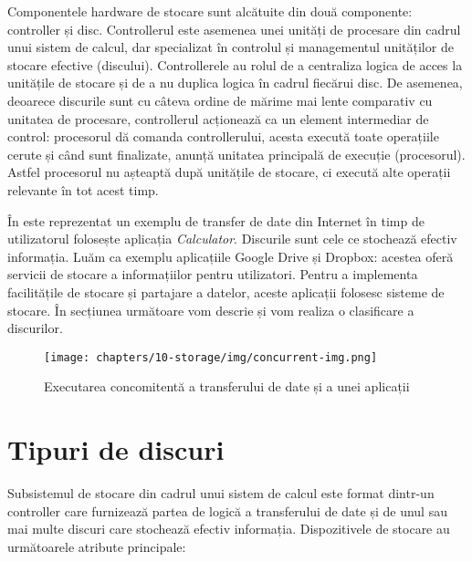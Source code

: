 Componentele hardware de stocare sunt alcătuite
din două componente: controller și disc. Controllerul este asemenea unei
unități de procesare din cadrul unui sistem de calcul, dar specializat în
controlul și managementul unităților de stocare efective (discului). Controllerele au
rolul de a centraliza logica de acces la unitățile de stocare și de a nu duplica
logica în cadrul fiecărui disc. De asemenea, deoarece discurile sunt cu câteva
ordine de mărime mai lente comparativ cu unitatea de procesare, controllerul
acționează ca un element intermediar de control: procesorul dă comanda
controllerului, acesta execută toate operațiile cerute și când sunt finalizate,
anunță unitatea principală de execuție (procesorul). Astfel procesorul nu
așteaptă după unitățile de stocare, ci execută alte operații relevante în tot
acest timp.

În  este reprezentat un
exemplu de transfer de date din Internet în timp de
utilizatorul folosește aplicația \textit{Calculator}. Discurile sunt cele ce
stochează efectiv informația. Luăm ca exemplu aplicațiile Google Drive și
Dropbox: acestea oferă servicii de stocare a informațiilor pentru utilizatori.
Pentru a implementa facilitățile de stocare și partajare a datelor, aceste
aplicații folosesc sisteme de stocare. În secțiunea următoare vom descrie și vom
realiza o clasificare a discurilor.

\begin{figure}[!htbp]
	\centering
	\texttt{[image: chapters/10-storage/img/concurrent-img.png]}
	\caption{Executarea concomitentă a transferului de date și a unei aplicații}
	\label{fig:storage:concurrent-access}
\end{figure}

\section{Tipuri de discuri}
\label{sec:storage:type}

Subsistemul de stocare din cadrul unui sistem de calcul este format dintr-un
controller care furnizează partea de logică a transferului de date și de unul
sau mai multe discuri care stochează efectiv informația. Dispozitivele de
stocare au următoarele atribute principale:

